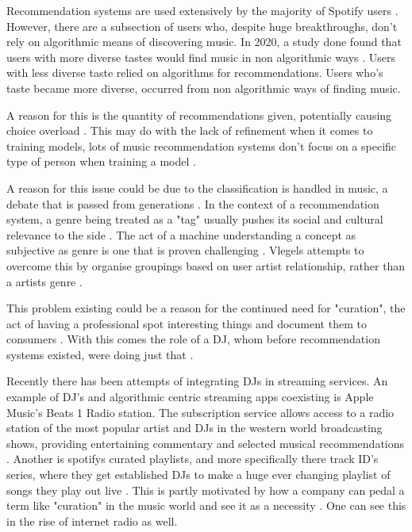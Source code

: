 Recommendation systems are used extensively by the majority of Spotify users \citep{spotify_spotify_2020}. However, there are a subsection of users who, despite huge breakthroughs, don't rely on algorithmic means of discovering music. In 2020, a study done found that users with more diverse tastes would find music in non algorithmic ways \citep{anderson_algorithmic_2020}. Users with less diverse taste relied on algorithms for recommendations. Users who's taste became more diverse, occurred from non algorithmic ways of finding music.

A reason for this is the quantity of recommendations given, potentially causing choice overload \citep{iyengar_rethinking_1999}. This may do with the lack of refinement when it comes to training models, lots of music recommendation systems don't focus on a specific type of person when training a model \citep{laplante_improving_2014}.

A reason for this issue could be due to the classification is handled in music, a debate that is passed from generations \citep{moles_sociodynamique_2019} \citep{dimaggio_classification_1987} \citep{bourdieu_distinction_2010}. In the context of a recommendation system, a genre being treated as a "tag" usually pushes its social and cultural relevance to the side \citep{porcaro_diversity_2021}. The act of a machine understanding a concept as subjective as genre is one that is proven challenging \citep{nurnberger_survey_2014}. Vlegels attempts to overcome this by organise groupings based on user artist relationship, rather than a artists genre \citep{vlegels_music_2017}.

This problem existing could be a reason for the continued need for "curation", the act of having a professional spot interesting things and document them to consumers \citep{barna_perfect_2017}. With this comes the role of a DJ, whom before recommendation systems existed, were doing just that \citep{percival_music_2011}. 

Recently there has been attempts of integrating DJs in streaming services.  An example of DJ's and algorithmic centric streaming apps coexisting is Apple Music's Beats 1 Radio station. The subscription service allows access to a radio station of the most popular artist and DJs in the western world broadcasting shows, providing entertaining commentary and selected musical recommendations \citep{dms_apple_2020}. Another is spotifys curated playlists, and more specifically there track ID's series, where they get established DJs to make a huge ever changing playlist of songs they play out live \citep{spotify_introducing_2020}. This is partly motivated by how a company can pedal a term like "curation" in the music world and see it as a necessity \citep{barna_perfect_2017}. One can see this in the rise of internet radio as well.  

